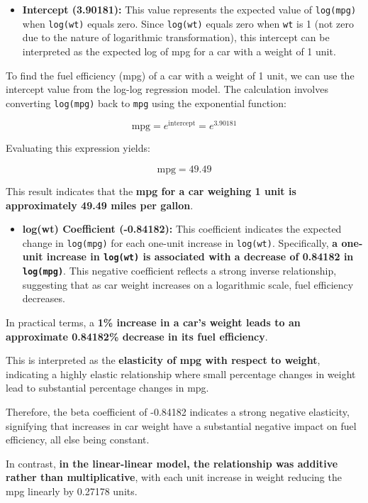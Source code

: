 \documentclass[
  letterpaper,
  DIV=11,
  numbers=noendperiod]{scrreport}
\providecommand{\tightlist}{%
  \setlength{\itemsep}{0pt}\setlength{\parskip}{0pt}}\usepackage{longtable,booktabs,array}
\begin{document}
\begin{itemize}
\tightlist
\item
  \textbf{Intercept (3.90181):} This value represents the expected value
  of \texttt{log(mpg)} when \texttt{log(wt)} equals zero. Since
  \texttt{log(wt)} equals zero when \texttt{wt} is 1 (not zero due to
  the nature of logarithmic transformation), this intercept can be
  interpreted as the expected log of mpg for a car with a weight of 1
  unit.
\end{itemize}

To find the fuel efficiency (mpg) of a car with a weight of 1 unit, we
can use the intercept value from the log-log regression model. The
calculation involves converting \texttt{log(mpg)} back to \texttt{mpg}
using the exponential function:

\[
\text{mpg} = e^{\text{intercept}} = e^{3.90181}
\]

Evaluating this expression yields:

\[
\text{mpg} = 49.49
\]

This result indicates that the \textbf{mpg for a car weighing 1 unit is
approximately 49.49 miles per gallon}.

\begin{itemize}
\tightlist
\item
  \textbf{log(wt) Coefficient (-0.84182):} This coefficient indicates
  the expected change in \texttt{log(mpg)} for each one-unit increase in
  \texttt{log(wt)}. Specifically, \textbf{a one-unit increase in
  \texttt{log(wt)} is associated with a decrease of 0.84182 in}
  \textbf{\texttt{log(mpg)}}. This negative coefficient reflects a
  strong inverse relationship, suggesting that as car weight increases
  on a logarithmic scale, fuel efficiency decreases.
\end{itemize}

In practical terms, a \textbf{1\% increase in a car's weight leads to an
approximate 0.84182\% decrease in its fuel efficiency}.

This is interpreted as the \textbf{elasticity of mpg with respect to
weight}, indicating a highly elastic relationship where small percentage
changes in weight lead to substantial percentage changes in mpg.

Therefore, the beta coefficient of -0.84182 indicates a strong negative
elasticity, signifying that increases in car weight have a substantial
negative impact on fuel efficiency, all else being constant.

In contrast, \textbf{in the linear-linear model, the relationship was
additive rather than multiplicative}, with each unit increase in weight
reducing the mpg linearly by 0.27178 units.
\end{document}
